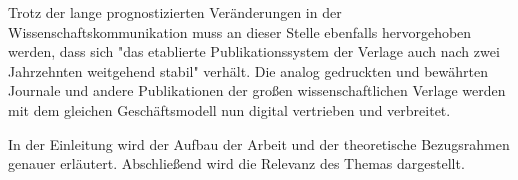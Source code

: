 Trotz der lange prognostizierten Veränderungen in der Wissenschaftskommunikation muss an dieser Stelle ebenfalls hervorgehoben werden, dass sich "das etablierte Publikationssystem der Verlage auch nach zwei Jahrzehnten weitgehend stabil"\cite{Hanekop_2014} verhält. Die analog gedruckten und bewährten Journale und andere Publikationen der großen wissenschaftlichen Verlage werden mit dem gleichen Geschäftsmodell nun digital vertrieben und verbreitet\cite{Hanekop_2014}.

In der Einleitung wird der Aufbau der Arbeit und der theoretische Bezugsrahmen genauer erläutert. Abschließend wird die Relevanz des Themas dargestellt.

